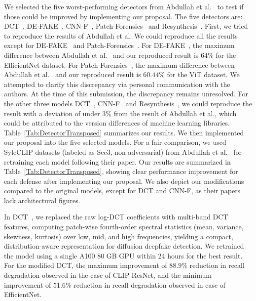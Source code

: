 \documentclass[letterpaper,twocolumn,10pt]{article}
\newcommand{\subhead}[1]{\vspace{1pt}\noindent{\textbf{#1.}}}
\begin{document}
\subhead{Improvement of weak detectors}
We selected the five worst-performing detectors from  Abdullah et al.~\cite{Sifat2024evolvingthreat} to test if those could be improved by implementing our proposal. The five detectors are: DCT~\cite{Ricker2024detection}, DE-FAKE~\cite{Sha2023DE-FAKE}, CNN-F~\cite{Wang2024cnngenerated}, Patch-Forensics~\cite{chai2020makesfakeimagesdetectable} and Resynthesis~\cite{he2021Resynthesis}. First, we tried to reproduce the results of Abdullah et al. We could reproduce all the results except for DE-FAKE~\cite{Sha2023DE-FAKE} and  Patch-Forensics~\cite{chai2020makesfakeimagesdetectable}.  
For DE-FAKE~\cite{Sha2023DE-FAKE}, the maximum difference between Abdullah et al.~\cite{Sifat2024evolvingthreat} and our reproduced result is $64\%$ for the EfficientNet dataset. For Patch-Forensics~\cite{chai2020makesfakeimagesdetectable}, the maximum difference between Abdullah et al.~\cite{Sifat2024evolvingthreat} and our reproduced result  is $60.44\%$ for the ViT dataset. 
We attempted to clarify this discrepancy via personal communication with the authors. At the time of this submission, the discrepancy remains unresolved.
For the other three models DCT~\cite{Ricker2024detection}, CNN-F~\cite{Wang2024cnngenerated} and Resynthesis~\cite{he2021Resynthesis}, we could reproduce the result with a deviation of under $3\%$ from the result of Abdullah et al., which could be attributed to the version differences of machine learning libraries. Table~\ref{Tab:DetectorTransposed} summarizes our results. We then implemented our proposal into the five selected models. For a fair comparison, we used SyleCLIP datasets (labeled as Sec3, non-adversarial) from Abdullah et al.~\cite{Sifat2024evolvingthreat} for retraining each model following their paper.
Our results are summarized in Table~\ref{Tab:DetectorTransposed}, showing clear performance improvement for each defense after implementing our proposal. We also depict our modifications compared to the original models, except for DCT and CNN-F, as their papers lack architectural figures. 

In DCT~\cite{Ricker2024detection}, we replaced the raw log-DCT coefficients with multi-band DCT features, computing patch-wise fourth-order spectral statistics (mean, variance, skewness, kurtosis) over low, mid, and high frequencies, yielding a compact, distribution-aware representation for diffusion deepfake detection. We retrained the model using a single A100 80 GB GPU within 24 hours for the best result.
For the modified DCT, the maximum improvement of $88.9\%$ reduction in recall degradation observed in the case of CLIP-ResNet, and the minimum improvement of $51.6\%$ reduction in recall degradation observed in case of EfficientNet. 
\end{document}
